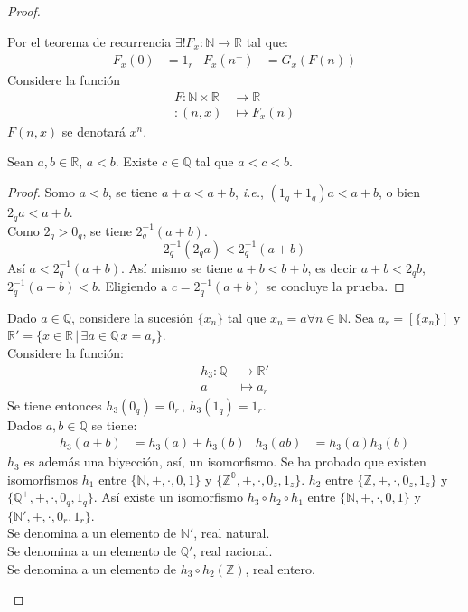 \begin{proof}
\begin{definition}
  Por el teorema de recurrencia $\exists ! F_x: \mathbb{N} \to \mathbb{R}$ tal
  que:
  \begin{align*}
    F_x(0) &= 1_r & F_x(n^+) &= G_x(F(n)) 
  \end{align*}
  Considere la función
  \begin{align*}
    F: \mathbb{N} \times \mathbb{R} &\to \mathbb{R} \\
    : (n,x) &\mapsto F_x(n)
  \end{align*}
  $F(n,x)$ se denotará $x^n$. \\
\end{definition}
\begin{proposition}\label{prop:54}
  Sean $a, b \in \mathbb{R}$, $a < b$. Existe $c \in \mathbb{Q}$ tal que 
  $a <c < b$.
\end{proposition}
\begin{proof} Somo $a<b$, se tiene $a + a < a + b$, \textit{i.e.},  $(1_q+ 1_q)
  a < a + b$, o bien $2_qa < a +b$. \\
  Como $2_q > 0_q$, se tiene $2_q^{-1}(a + b)$.
  \[
    2_q^{-1} (2_q a) < 2_q^{-1}(a + b)
  \]
  Así $a < 2_q^{-1} (a+b)$.
  Así mismo se tiene $a+b < b + b$, es decir $a + b < 2_q b$, $2_q^{-1}(a + b)
  <b$.  Eligiendo a $c = 2_q^{-1}(a + b)$ se concluye la prueba.
\end{proof}
\begin{definition}
  Dado $a \in \mathbb{Q}$, considere la sucesión $\{x_n\}$ tal que  $x_n = a
  \forall n \in \mathbb{N}$. Sea $a_r = [\{x_n\}]$ y $\mathbb{R}' = \{x \in
  \mathbb{R} \, | \, \exists a \in \mathbb{Q} \, x = a_r \}$. \\

  Considere la función:
  \begin{align*}
    h_3 : \mathbb{Q} &\to \mathbb{R'} \\
    a & \mapsto a_r
  \end{align*}
  Se tiene entonces $h_3(0_q) = 0_r \, , \, h_3(1_q) = 1_r$. \\
  Dados $a,b \in \mathbb{Q}$ se tiene:
  \begin{align*}
    h_3(a+b) &= h_3(a) + h_3(b) &  h_3(ab) &= h_3(a)h_3(b)
  \end{align*}
  $h_3$ es además una biyección, así, un isomorfismo. Se ha probado que existen
  isomorfismos $h_1$ entre $\{\mathbb{N}, +, \cdot, 0, 1\}$ y $\{\mathbb{Z^0}, +,
  \cdot, 0_z, 1_z\}$. $h_2$ entre $\{\mathbb{Z}, +, \cdot, 0_z, 1_z \}$ y
  $\{\mathbb{Q}^+, +, \cdot, 0_q, 1_q\}$. Así existe un isomorfismo $h_3 \circ
  h_2 \circ h_1$ entre $\{\mathbb{N}, +, \cdot, 0, 1\}$ y $\{\mathbb{N'}, +,
  \cdot, 0_r, 1_r\}$. \\
  Se denomina a un elemento de $\mathbb{N}'$, real natural. \\
  Se denomina a un elemento de $\mathbb{Q}'$, real racional. \\
  Se denomina a un elemento de $h_3 \circ h_2(\mathbb{Z})$, real entero. 
\end{definition}


\end{proof}
